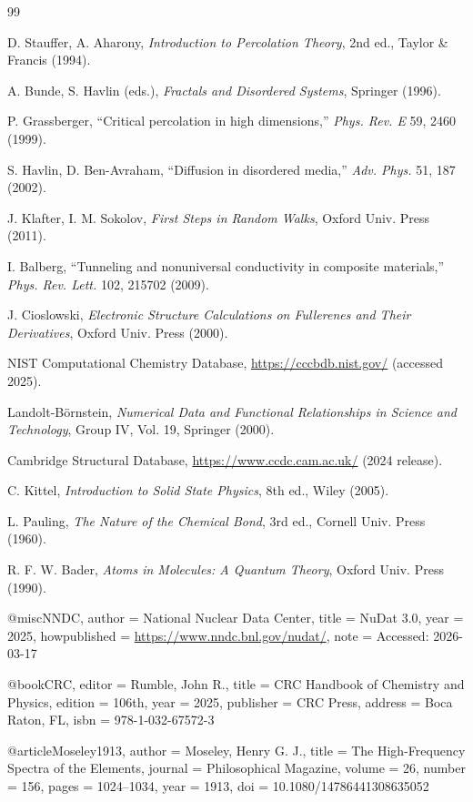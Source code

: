 \documentclass[12pt,a4paper]{article}
\theoremstyle{remark}
\begin{document}
	\begin{thebibliography}{99}
		
		
		D. Stauffer, A. Aharony, \emph{Introduction to Percolation Theory}, 2nd ed., Taylor \& Francis (1994).
		
		A. Bunde, S. Havlin (eds.), \emph{Fractals and Disordered Systems}, Springer (1996).
		
		P. Grassberger, ``Critical percolation in high dimensions,'' \emph{Phys. Rev. E} 59, 2460 (1999).
		
		S. Havlin, D. Ben-Avraham, ``Diffusion in disordered media,'' \emph{Adv. Phys.} 51, 187 (2002).
		
		J. Klafter, I. M. Sokolov, \emph{First Steps in Random Walks}, Oxford Univ. Press (2011).
		
		I. Balberg, ``Tunneling and nonuniversal conductivity in composite materials,'' \emph{Phys. Rev. Lett.} 102, 215702 (2009).
		
		J. Cioslowski, \emph{Electronic Structure Calculations on Fullerenes and Their Derivatives}, Oxford Univ. Press (2000).
		
		NIST Computational Chemistry Database, \url{https://cccbdb.nist.gov/} (accessed 2025).
		
		Landolt-Börnstein, \emph{Numerical Data and Functional Relationships in Science and Technology}, Group IV, Vol. 19, Springer (2000).
		
		Cambridge Structural Database, \url{https://www.ccdc.cam.ac.uk/} (2024 release).
		
		C. Kittel, \emph{Introduction to Solid State Physics}, 8th ed., Wiley (2005).
		
		L. Pauling, \emph{The Nature of the Chemical Bond}, 3rd ed., Cornell Univ. Press (1960).
		
		R. F. W. Bader, \emph{Atoms in Molecules: A Quantum Theory}, Oxford Univ. Press (1990).
		
		@misc{NNDC,
			author       = {{National Nuclear Data Center}},
			title        = {NuDat 3.0},
			year         = {2025},
			howpublished = {\url{https://www.nndc.bnl.gov/nudat/}},
			note         = {Accessed: 2026-03-17}
		}
		
		@book{CRC,
			editor       = {Rumble, John R.},
			title        = {CRC Handbook of Chemistry and Physics},
			edition      = {106th},
			year         = {2025},
			publisher    = {CRC Press},
			address      = {Boca Raton, FL},
			isbn         = {978-1-032-67572-3}
		}
		
		@article{Moseley1913,
			author       = {Moseley, Henry G. J.},
			title        = {The High-Frequency Spectra of the Elements},
			journal      = {Philosophical Magazine},
			volume       = {26},
			number       = {156},
			pages        = {1024--1034},
			year         = {1913},
			doi          = {10.1080/14786441308635052}
		}
	\end{thebibliography}
	
\end{document}
